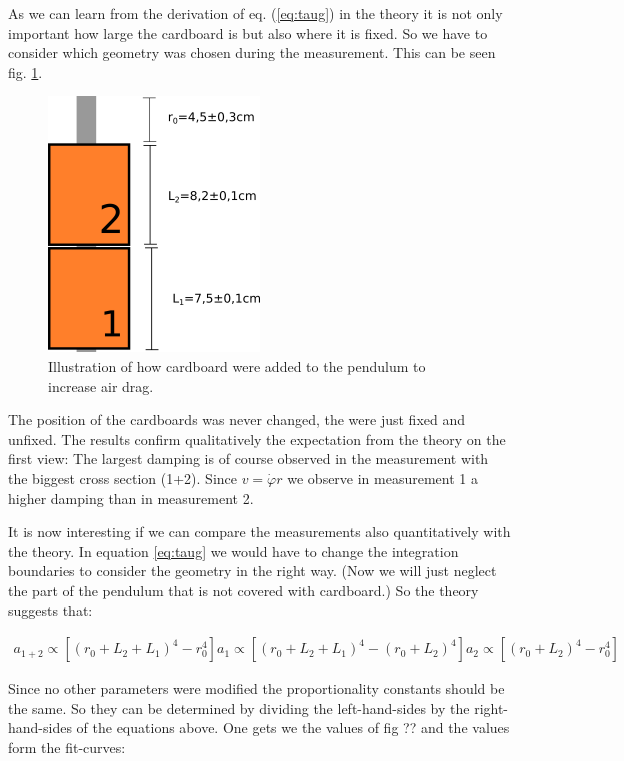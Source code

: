 As we can learn from the derivation of eq. (\ref{eq:taug}) in the theory it is not only important how large the cardboard is but also where it is fixed. So we have to consider which geometry was chosen during the measurement. This can be seen fig. \ref{fig:geometry}. 
\begin{figure}[htbp]
	\centering
	\includegraphics[width=0.5\textwidth]{img/draggeom}
	\caption{Illustration of how cardboard were added to the pendulum to increase air drag.}
	\label{fig:geometry}
\end{figure}
The position of the cardboards was never changed, the were just fixed and unfixed. The results confirm qualitatively the expectation from the theory on the first view: The largest damping is of course observed in the measurement with the biggest cross section (1+2). Since $v=\dot{\varphi}r$ we observe in measurement 1 a higher damping than in measurement 2. 

It is now interesting if we can compare the measurements also quantitatively with the theory. In equation  \ref{eq:taug} we would have to change the integration boundaries to consider the geometry in the right way. (Now we will just neglect the part of the pendulum that is not covered with cardboard.) So the theory suggests that:


\begin{eqnarray}
a_{1+2} \propto \left[ \left(r_0+L_2+L_1\right)^4-r_0^4\right]
a_1 \propto \left[ \left(r_0+L_2+L_1\right)^4-\left(r_0+L_2\right)^4\right]
a_2 \propto \left[ \left(r_0+L_2\right)^4-r_0^4\right]
\end{eqnarray}

Since no other parameters were modified the proportionality constants should be the same. So they can be determined by dividing the left-hand-sides by the right-hand-sides of the equations above. One gets we the values of fig ?? and the values form the fit-curves:
  
